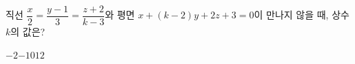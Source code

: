 직선 $\dfrac{x}{2}=\dfrac{y-1}{3}=\dfrac{z+2}{k-3}$와 평면 $x+(k-2)y+2z+3=0$이 만나지 않을 때, 상수 $k$의 값은?
\begin{choices32}{$-2$}{$-1$}{$0$}{$1$}{$2$}\end{choices32}
